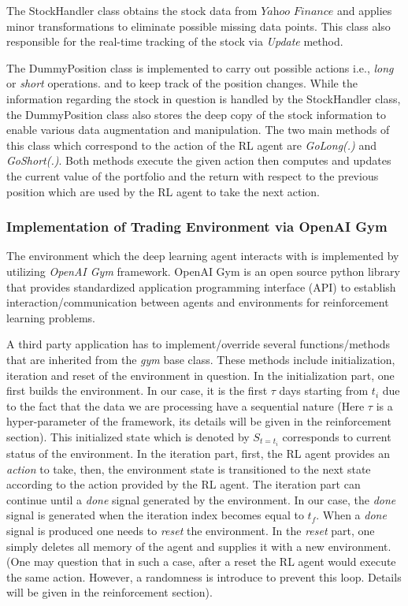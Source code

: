 \documentclass[conference]{IEEEtran}
\begin{document}
The StockHandler class obtains the stock data from \(\textit{Yahoo Finance}\) and applies minor transformations to eliminate possible missing data points. This class also responsible for the real-time tracking of the stock via \textit{Update} method. 


The DummyPosition class is implemented to carry out possible actions i.e., \textit{long} or \textit{short} operations. and to keep track of the position changes. While the information regarding the stock in question is handled by the StockHandler class, the DummyPosition class also stores the deep copy of the stock information to enable various data augmentation and manipulation. The two main methods of this class which correspond to the action of the RL agent are \textit{GoLong(.)} and \textit{GoShort(.)}. Both methods execute the given action then computes and updates the current value of the portfolio and the return with respect to the previous position which are used by the RL agent to take the next action.


\subsubsection{Implementation of Trading Environment via OpenAI Gym}

The environment which the deep learning agent interacts with is implemented by utilizing \textit{OpenAI Gym} framework. OpenAI Gym is an open source python library that provides standardized application programming interface (API) to establish interaction/communication between agents and environments for reinforcement learning problems. 

A third party application has to implement/override several functions/methods that are inherited from the \textit{gym} base class. These methods include initialization, iteration and reset of the environment in question. In the initialization part, one first builds the environment. In our case, it is the first \(\tau\) days starting from \(t_i\) due to the fact that the data we are processing have a sequential nature (Here \(\tau\) is a hyper-parameter of the framework, its details will be given in the reinforcement section). This initialized state which is denoted by \(S_{t=t_i}\) corresponds to current status of the environment. In the iteration part, first, the RL agent provides an \textit{action} to take, then, the environment state is transitioned to the next state according to the action provided by the RL agent. The iteration part can continue until a \textit{done} signal generated by the environment. In our case, the \textit{done} signal is generated when the iteration index becomes equal to \(t_f\). When a \textit{done} signal is produced one needs to \textit{reset} the environment. In the \textit{reset} part, one simply deletes all memory of the agent and supplies it with a new environment. (One may question that in such a case, after a reset the RL agent would execute the same action. However, a randomness is introduce to prevent this loop. Details will be given in the reinforcement section).
\end{document}
